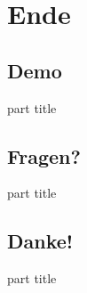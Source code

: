 \documentclass[11pt]{beamer}
\begin{document}
\section*{Ende}
\subsection*{Demo}
\begin{frame}
  \begin{centering}
    \begin{beamercolorbox}[sep=12pt,center]{part title}
      \par
    \end{beamercolorbox}
  \end{centering}
\end{frame}

\subsection*{Fragen?}
\begin{frame}
  \begin{centering}
    \begin{beamercolorbox}[sep=12pt,center]{part title}
      \par
    \end{beamercolorbox}
  \end{centering}
\end{frame}
\subsection*{Danke!}
\begin{frame}
  \begin{centering}
    \begin{beamercolorbox}[sep=12pt,center]{part title}
      \par
    \end{beamercolorbox}
  \end{centering}
\end{frame}
\end{document}
